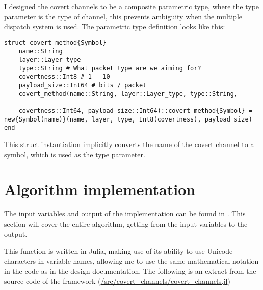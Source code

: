I designed the covert channels to be a composite parametric type, where the type parameter is the type of channel, this prevents ambiguity when the multiple dispatch system is used. The parametric type definition looks like this:

\begin{lstlisting}[language=JuliaLocal, style=julia]
struct covert_method{Symbol}
    name::String
    layer::Layer_type
    type::String # What packet type are we aiming for?
    covertness::Int8 # 1 - 10
    payload_size::Int64 # bits / packet
    covert_method(name::String, layer::Layer_type, type::String, 
    
    covertness::Int64, payload_size::Int64)::covert_method{Symbol} = new{Symbol(name)}(name, layer, type, Int8(covertness), payload_size)
end
\end{lstlisting}

This struct instantiation implicitly converts the name of the covert channel to a symbol, which is used as the type parameter.

\section{Algorithm implementation}
\label{sec:algorithm_impl}

The input variables and output of the implementation can be found in . This section will cover the entire algorithm, getting from the input variables to the output.

This function is written in Julia, making use of its ability to use Unicode characters in variable names, allowing me to use the same mathematical notation in the code as in the design documentation. The following is an extract from the source code of the framework (\url{/src/covert_channels/covert_channels.jl})

